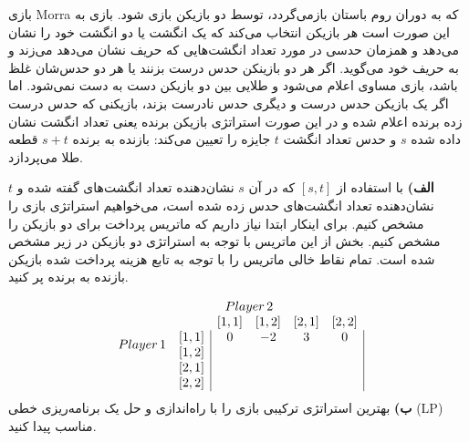 بازی Morra که به دوران روم باستان بازمی‌گردد، توسط دو بازیکن بازی شود. بازی به این صورت است هر بازیکن انتخاب می‌کند که یک انگشت یا دو انگشت خود را نشان می‌دهد و همزمان حدسی در مورد تعداد انگشت‌هایی که حریف نشان می‌دهد می‌زند و به حریف خود می‌گوید. اگر هر دو بازینکن حدس درست بزنند یا هر دو حدس‌شان غلظ باشد، بازی مساوی اعلام می‌شود و طلایی بین دو بازیکن دست به دست نمی‌شود. اما اگر یک بازیکن حدس درست و دیگری حدس نادرست بزند، بازیکنی که حدس درست زده برنده اعلام شده و در این صورت استراتژی بازیکن برنده یعنی تعداد انگشت نشان داده شده $s$ و حدس تعداد انگشت $t$ جایزه را تعیین می‌کند: بازنده به برنده $s + t$ قطعه طلا می‌پردازد.
\vspace*{10pt}

\textbf{الف)}
با استفاده از 
$[s,t]$
که در آن
$s$
نشان‌دهنده تعداد انگشت‌های گفته شده و 
$t$
نشان‌دهنده تعداد انگشت‌های حدس زده شده است، می‌خواهیم استراتژی بازی را مشخص کنیم. برای اینکار ابتدا نیاز داریم که ماتریس پرداخت برای دو بازیکن را مشخص کنیم. بخش از این ماتریس با توجه به استراتژی دو بازیکن در زیر مشخص شده است. تمام نقاط خالی ماتریس را با توجه به تابع هزینه پرداخت شده بازیکن بازنده به برنده پر کنید.

\[
    \begin{array}{c c | c c c c |}
    & \multicolumn{1}{c}{} & \multicolumn{2}{c}{Player\,2} & \multicolumn{2}{c}{\text{}} \\
    & \multicolumn{1}{c}{} & \multicolumn{1}{c}{[1,1]} & \multicolumn{1}{c}{[1,2]} & \multicolumn{1}{c}{[2,1]} & \multicolumn{1}{c}{[2,2]} \\
    \multirow{2}*{$Player\,1$} & [1,1] & 0 & -2 & 3 & 0 \\
    & [1,2] &  &  &  & \\
    & [2,1] &  &  &  &  \\
    & [2,2] &  &  &  &  
    \end{array}
\]
\textbf{ب)}
بهترین استراتژی ترکیبی بازی را با راه‌اندازی و حل یک برنامه‌ریزی خطی (LP) مناسب پیدا کنید.
